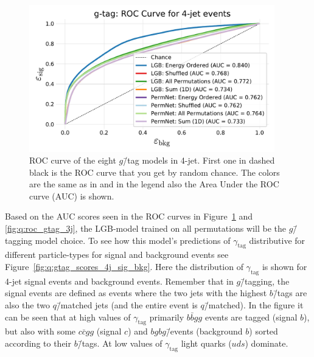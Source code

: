 \begin{figure}[h!]
  \centerfloat
  \includegraphics[width=0.95\textwidth, trim=10 10 10 40, clip]{figures/quarks/gtag_ROC_4_jet-down_sample=1.00-ML_vars=vertex-selection=b-ejet_min=4-n_iter_RS_lgb=99-n_iter_RS_xgb=9-cdot_cut=0.90-version=19.pdf}
  \caption[ROC Curve for $g$\=/Tag in 4-Jet Events]
          {ROC curve of the eight $g$\=/tag models in 4-jet. First one in dashed black is the ROC curve that you get by random chance. The colors are the same as in  and in the legend also the Area Under the ROC curve (AUC) is shown.} 
  \label{fig:q:roc_gtag_4j}
\end{figure}

Based on the AUC scores seen in the ROC curves in Figure~\ref{fig:q:roc_gtag_4j} and \ref{fig:q:roc_gtag_3j}, the LGB-model trained on all permutations will be the $g$\=/tagging model choice. To see how this model's predictions of $\gamma_\mathrm{tag}$ distributive for different particle-types for signal and background events see Figure~\ref{fig:q:gtag_scores_4j_sig_bkg}. Here the distribution of $\gamma_\mathrm{tag}$ is shown for 4-jet signal events and background events. Remember that in $g$\=/tagging, the signal events are defined as events where the two jets with the highest $b$\=/tags are also the two $q$\=/matched jets (and the entire event is $q$\=/matched). In the figure it can be seen that at high values of $\gamma_\mathrm{tag}$ primarily $b\bar{b}gg$ events are tagged (signal $b$), but also with some $c\bar{c}gg$ (signal $c$) and $bgbg$\=/events (background $b$) sorted according to their $b$\=/tags. At low values of $\gamma_\mathrm{tag}$ light quarks ($uds$) dominate. 

